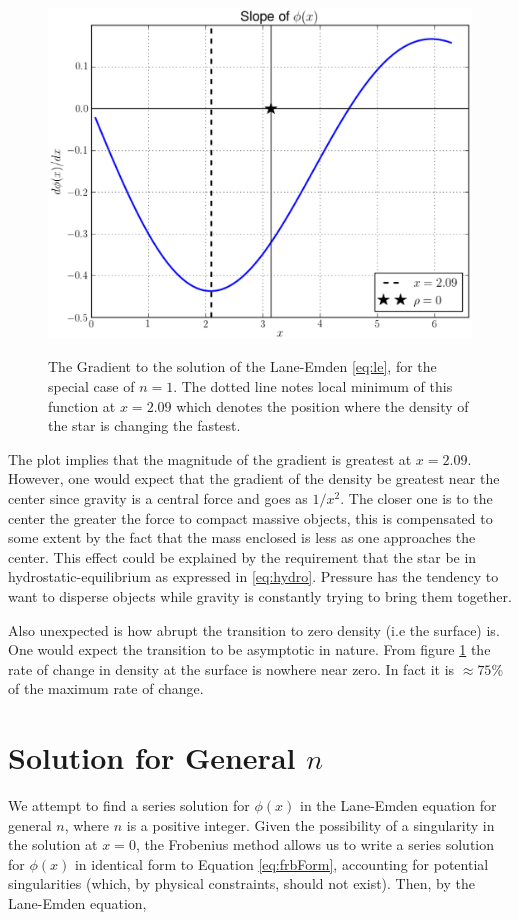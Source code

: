 \documentclass[12pt, manuscript]{article}
\begin{document}
\begin{figure}[h]
  \begin{center}
      \includegraphics[scale=0.7]{images/SlopePhi.eps}\label{f:grad}
  \caption{The Gradient to the solution of the Lane-Emden \eqref{eq:le}, for the special case of $n=1$. The dotted line notes local minimum of this function at $x=2.09$ which denotes the position where the density of the star is changing the fastest.}
  \end{center}
  \end{figure}
The plot implies that the magnitude of the  gradient is greatest at $x=2.09$. However, one would expect that the gradient of the density be greatest near the center since gravity is a central force and goes as $1/x^{2}$. The closer one is to the center the greater the force to compact massive objects, this is compensated to some extent by the fact that the mass enclosed is less as one approaches the center. This effect could be explained by the requirement that the star be in hydrostatic-equilibrium as expressed in \eqref{eq:hydro}. Pressure has the tendency to want to disperse objects while gravity is constantly trying to bring them together. \par

Also unexpected is how abrupt the transition to zero density (i.e the surface) is. One would expect the transition to be asymptotic in nature. From figure \ref{f:grad} the rate of change in density at the surface is nowhere near zero. In fact it is $\approx75$\% of the maximum rate of change.

\section*{Solution for General $n$}
We attempt to find a series solution for $\phi \left( x \right)$ in the Lane-Emden equation for general $n$, where $n$ is a positive integer. Given the possibility of a singularity in the solution at $x = 0$, the Frobenius method allows us to write a series solution for $\phi \left( x \right)$ in identical form to Equation \eqref{eq:frbForm}, accounting for potential singularities (which, by physical constraints, should not exist). Then, by the Lane-Emden equation,
\end{document}
